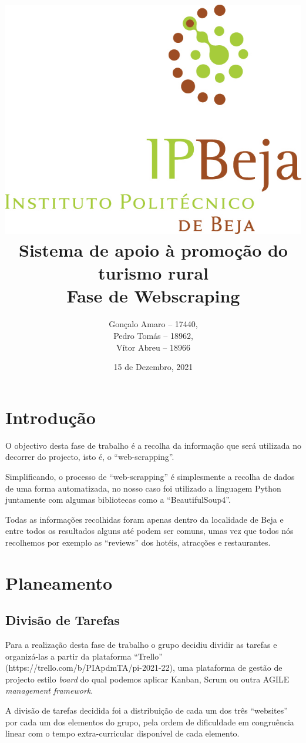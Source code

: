 \documentclass[a4paper,10pt]{article}
\title{\includegraphics[scale=0.5]{ipbeja_logo.png}\\[0.5cm]Sistema de apoio à promoção do turismo rural\\Fase de Webscraping} %
\author{Gonçalo Amaro -- 17440,\\ Pedro Tomás -- 18962,\\ Vítor Abreu -- 18966} %
\date{15 de Dezembro, 2021} %
\def\blankpage{%
      \clearpage%
      \thispagestyle{empty}%
      \addtocounter{page}{-1}%
      \null%
      \clearpage}
\begin{document}


\maketitle

\blankpage{}

{
  \hypersetup{linkcolor=black}
  \tableofcontents
}

\newpage

{
  \hypersetup{linkcolor=black}
  \listoffigures
  \listoftables
}

\newpage

\section{Introdução}

O objectivo desta fase de trabalho é a recolha da informação que será utilizada no decorrer do projecto, isto é, o ``web-scrapping''.

Simplificando, o processo de ``web-scrapping'' é simplesmente a recolha de dados de uma forma automatizada, no nosso caso foi utilizado a linguagem Python juntamente com algumas bibliotecas como a ``BeautifulSoup4''.

Todas as informações recolhidas foram apenas dentro da localidade de Beja e entre todos os resultados alguns até podem ser comuns, umas vez que todos nós recolhemos por exemplo as ``reviews'' dos hotéis, atracções e restaurantes.

\section{Planeamento}

\subsection{Divisão de Tarefas}

Para a realização desta fase de trabalho o grupo decidiu dividir as tarefas e organizá-las a partir da plataforma ``Trello'' (https://trello.com/b/PIApdmTA/pi-2021-22), uma plataforma de gestão de projecto estilo \textit{board} do qual podemos aplicar Kanban, Scrum ou outra AGILE \textit{management framework}.

A divisão de tarefas decidida foi a distribuição de cada um dos três ``websites'' por cada um dos elementos do grupo, pela ordem de dificuldade em congruência linear com o tempo extra-curricular disponível de cada elemento.
\end{document}
